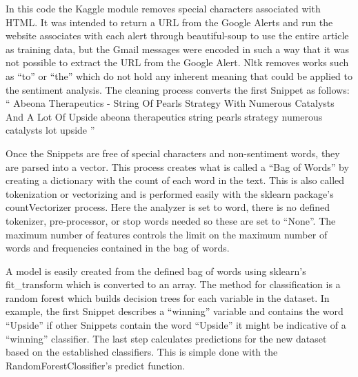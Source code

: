 \documentclass[sigconf]{acmart}
\begin{document}
In this code the Kaggle module removes special characters associated with HTML. It was intended to return a URL from the Google Alerts and run the website associates with each alert through beautiful-soup to use the entire article as training data, but the Gmail messages were encoded in such a way that it was not possible to extract the URL from the Google Alert. Nltk removes works such as ``to'' or ``the'' which do not hold any inherent meaning that could be applied to the sentiment analysis. The cleaning process converts the first Snippet as follows:
``
Abeona Therapeutics - String Of Pearls Strategy With Numerous Catalysts And A Lot Of Upside
abeona therapeutics string pearls strategy numerous catalysts lot upside
''

Once the Snippets are free of special characters and non-sentiment words, they are parsed into a vector. This process creates what is called a ``Bag of Words'' by creating a dictionary with the count of each word in the text. This is also called tokenization or vectorizing and is performed easily with the sklearn package's countVectorizer process. Here the analyzer is set to word, there is no defined tokenizer, pre-processor, or stop words needed so these are set to ``None''. The maximum number of features controls the limit on the maximum number of words and frequencies contained in the bag of words. 

A model is easily created from the defined bag of words using sklearn's fit\_transform which is converted to an array. The method for classification is a random forest which builds decision trees for each variable in the dataset. In example, the first Snippet describes a ``winning'' variable and contains the word ``Upside'' if other Snippets contain the word ``Upside'' it might be indicative of a ``winning'' classifier. The last step calculates predictions for the new dataset based on the established classifiers. This is simple done with the RandomForestClossifier's predict function.
\end{document}
